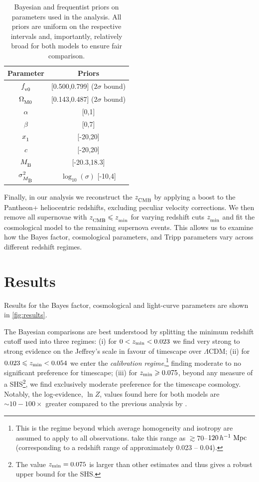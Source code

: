 \documentclass[fleqn,usenatbib]{mnras}
\newcommand{\LA}{\Lambda}
\newcommand{\LCDM}{$\LA$CDM}
\newcommand{\Z}[1]{_{\lower2pt\hbox{$\scriptstyle#1$}}}
\newcommand{\Ns}[1]{_{\lower2pt\hbox{$\scriptstyle\rm#1$}}}
\newcommand{\w}[1]{\mathop{\hbox{\,#1}}}
\newcommand{\gsim}{\gtrsim}
\newcommand{\h}{\,h^{-1}}
\newcommand{\hM}{\h\w{Mpc}}
\newcommand{\ns}[1]{_{\rm #1}}
\newcommand{\zmin}{z\ns{min}}
\begin{document}
\begin{table}
\centering
\caption{Bayesian and frequentist priors on parameters used in the analysis. All priors are uniform on the respective intervals and, importantly, relatively broad for both models to ensure fair comparison.}
\begin{tabular}{c | c  } 
    \hline
     Parameter & Priors \\ %
    \hline
    \hline
    $f\Ns{v0}$ & [0.500,0.799] ($2 \sigma$ bound) \\ [0.8ex]
    $\Omega\Ns{M0}$ & [0.143,0.487] ($2 \sigma$ bound) \\ [0.8ex]
    $\alpha$ & [0,1] \\ [0.8ex] 
    $\beta$ & [0,7] \\ [0.8ex] 
    $x\Z 1$ & [-20,20] \\ [0.8ex] 
    $c$ & [-20,20] \\ [0.8ex] 
    $M\Ns{B}$ & [-20.3,18.3] \\ [0.8ex] 
    $\sigma\Z{M\Ns{B}}^2$ & $\log_{10}(\sigma)$ [-10,4] \\ [0.8ex] 
    \hline
\end{tabular}
\label{tab:priors}
\end{table}

Finally, in our analysis we reconstruct the $z \Ns {CMB}$ by applying a boost \citep{Fixsen_1996} to the Pantheon+ heliocentric redshifts, excluding peculiar velocity corrections. We then remove all supernovae with $z \Ns {CMB} \leq z \Ns {min}$ for varying redshift cuts $z\Ns {min}$ and fit the cosmological model to the remaining supernova events. This allows us to examine how the Bayes factor, cosmological parameters, and Tripp parameters vary across different redshift regimes.

\section{Results}\label{sec:results}

Results for the Bayes factor, cosmological and light-curve parameters are shown in \cref{fig:results}.

The Bayesian comparisons are best understood by splitting the minimum redshift cutoff used into three regimes: (i) for $0< \zmin < 0.023$ we find very strong to strong evidence on the Jeffrey's scale \citep{Kass_1995} in favour of timescape over \LCDM; (ii) for $0.023\leq \zmin < 0.054$ we enter the \textit{calibration regime},\footnote{This is the regime beyond which average homogeneity and isotropy are assumed to apply to all observations. \citet{Hogg_2005, Scrimgeour_2012} take this range as $\gsim70$--$120\hM$ (corresponding to a redshift range of approximately 0.023 -- 0.04).} finding moderate to no significant preference for timescape; (iii) for $\zmin \geq 0.075$, beyond any measure of a SHS\footnote{The \citet{Lane_2023} value $\zmin=0.075$ is larger than other estimates and thus gives a robust upper bound for the SHS.}, we find exclusively moderate preference for the timescape cosmology. Notably, the log-evidence, $\ln Z$, values found here for both models are $\sim 10-100\times$ greater compared to the previous analysis by \citet{Lane_2023}.
\end{document}
